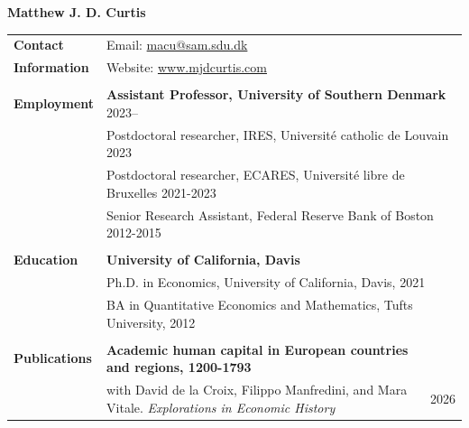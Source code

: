 \documentclass[a4paper,11pt,oneside]{article}
\begin{document}

\noindent  \LARGE{\textbf{Matthew J. D. Curtis}}  \\

\normalsize




\noindent \begin{longtable}{@{} p{0.175\linewidth} p{0.775\linewidth} p{0.05\linewidth}}
   
   
   
   \textbf{\large{Contact}}    &  \multicolumn{2}{l}{Email: \href{mailto:macu@sam.sdu.dk}{macu@sam.sdu.dk} }\\
   \textbf{\large{Information}}  &  \multicolumn{2}{l}{Website: \href{https://www.mjdcurtis.com/}{www.mjdcurtis.com} }\\
   \\ 
   
   \textbf{\large{Employment}}   
   &  \multicolumn{2}{l}{  \textbf{Assistant Professor, University of Southern Denmark} \hfill  2023--}\\
   &  \multicolumn{2}{l}{ Postdoctoral researcher, IRES, Universit\'{e} catholic de Louvain \hfill  2023}\\
   &  \multicolumn{2}{l}{ Postdoctoral researcher, ECARES, Universit\'{e} libre de Bruxelles \hfill  2021-2023}\\
   &  \multicolumn{2}{l}{ Senior Research Assistant, Federal Reserve Bank of Boston \hfill  2012-2015}\\
   \\
   \textbf{\large{Education}}    & \multicolumn{2}{l}{\textbf{University of California, Davis}} \\
   &  \multicolumn{2}{l}{Ph.D. in Economics, University of California, Davis, 2021}\\
   &  \multicolumn{2}{l}{BA in Quantitative Economics and Mathematics, Tufts University, 2012}\\
   \\
   
   \textbf{\large{Publications}}      
   
    & \textbf{Academic human capital in European countries and regions, 1200-1793}\\ 
   &   with David de la Croix, Filippo Manfredini, and Mara Vitale. \emph{Explorations in Economic History}&  \hfill 2026  \\


\end{longtable}
\end{document}

